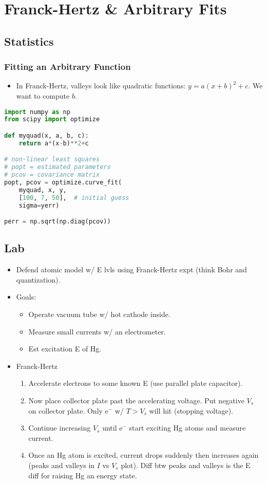 \documentclass[twocolumn]{article}
\begin{document}
\section{Franck-Hertz \& Arbitrary Fits}
\subsection{Statistics}
\subsubsection{Fitting an Arbitrary Function}
\begin{itemize}
    \item In Franck-Hertz, valleys look like quadratic functions: $y = a(x+b)^2 + c$. We want to compute $b$.
\end{itemize} \vspace{-.5em}

\begin{lstlisting}[language=python]
import numpy as np
from scipy import optimize

def myquad(x, a, b, c):
    return a*(x-b)**2+c

# non-linear least squares
# popt = estimated parameters
# pcov = covariance matrix
popt, pcov = optimize.curve_fit(
    myquad, x, y,
    [100, 7, 50],  # initial guess
    sigma=yerr)

perr = np.sqrt(np.diag(pcov))
\end{lstlisting}

\subsection{Lab}
\begin{itemize}
    \item Defend atomic model w/ E lvls using Franck-Hertz expt (think Bohr and quantization).
    \item Goals:
    \begin{itemize}
        \item Operate vacuum tube w/ hot cathode inside.
        \item Measure small currents w/ an electrometer.
        \item Est excitation E of Hg.
    \end{itemize}
    \item Franck-Hertz
    \begin{enumerate}
        \item Accelerate electrons to some known E (use parallel plate capacitor).
        \item Now place collector plate past the accelerating voltage. Put negative $V_s$ on collector plate. Only e$^-$ w/ $T > V_s$ will hit (stopping voltage).
        \item Continue increasing $V_s$ until e$^-$ start exciting Hg atoms and measure current.
        \item Once an Hg atom is excited, current drops suddenly then increases again (peaks and valleys in $I$ vs $V_s$ plot). Diff btw peaks and valleys is the E diff for raising Hg an energy state.
    \end{enumerate}
\end{itemize}
\end{document}
